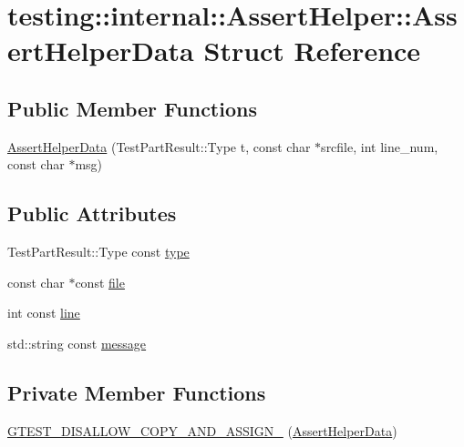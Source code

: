 \hypertarget{structtesting_1_1internal_1_1AssertHelper_1_1AssertHelperData}{}\section{testing\+:\+:internal\+:\+:Assert\+Helper\+:\+:Assert\+Helper\+Data Struct Reference}
\label{structtesting_1_1internal_1_1AssertHelper_1_1AssertHelperData}
\subsection*{Public Member Functions}
\begin{DoxyCompactItemize}
\item 
\hyperlink{structtesting_1_1internal_1_1AssertHelper_1_1AssertHelperData_ad2356f3f1e56d1a63562efe0f8b3f1bb}{Assert\+Helper\+Data} (Test\+Part\+Result\+::\+Type t, const char $\ast$srcfile, int line\+\_\+num, const char $\ast$msg)
\end{DoxyCompactItemize}
\subsection*{Public Attributes}
\begin{DoxyCompactItemize}
\item 
Test\+Part\+Result\+::\+Type const \hyperlink{structtesting_1_1internal_1_1AssertHelper_1_1AssertHelperData_a7b1d1a77882cd82107acea856d45692f}{type}
\item 
const char $\ast$const \hyperlink{structtesting_1_1internal_1_1AssertHelper_1_1AssertHelperData_a639ae4acc706e919b101786f71e9dc15}{file}
\item 
int const \hyperlink{structtesting_1_1internal_1_1AssertHelper_1_1AssertHelperData_aff816673320ecd035288dffe44760f90}{line}
\item 
std\+::string const \hyperlink{structtesting_1_1internal_1_1AssertHelper_1_1AssertHelperData_ae81536d57b8deb5dca4159cc6f7efdf0}{message}
\end{DoxyCompactItemize}
\subsection*{Private Member Functions}
\begin{DoxyCompactItemize}
\item 
\hyperlink{structtesting_1_1internal_1_1AssertHelper_1_1AssertHelperData_a5cfdd2fca371e33566ffdb2357606df2}{G\+T\+E\+S\+T\+\_\+\+D\+I\+S\+A\+L\+L\+O\+W\+\_\+\+C\+O\+P\+Y\+\_\+\+A\+N\+D\+\_\+\+A\+S\+S\+I\+G\+N\+\_\+} (\hyperlink{structtesting_1_1internal_1_1AssertHelper_1_1AssertHelperData}{Assert\+Helper\+Data})
\end{DoxyCompactItemize}


